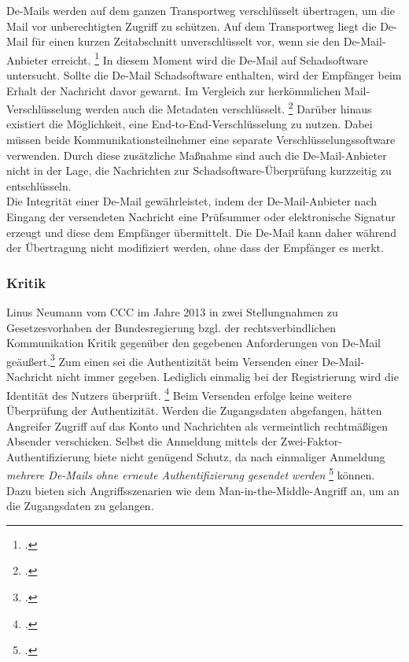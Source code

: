 \documentclass  [paper=a4,
				fontsize=12pt,
				listof=totoc,
				bibliography=totoc
				]{scrreprt}
\begin{document}
{			De-Mails werden auf dem ganzen Transportweg verschlüsselt übertragen, um die Mail vor unberechtigten Zugriff zu schützen.
			Auf dem Transportweg liegt die De-Mail für einen kurzen Zeitabschnitt unverschlüsselt vor, wenn sie den De-Mail-Anbieter erreicht. \footcite[Vgl.][S. 16]{BSIDeMail} 
			In diesem Moment wird die De-Mail auf Schadsoftware untersucht. Sollte die De-Mail Schadsoftware enthalten, wird der Empfänger beim Erhalt der Nachricht davor gewarnt.
			Im Vergleich zur herkömmlichen Mail-Verschlüsselung werden auch die Metadaten verschlüsselt. \footcite[Vgl.][]{BSIMerkmale}
			Darüber hinaus existiert die Möglichkeit, eine End-to-End-Verschlüsselung zu nutzen.
			Dabei müssen beide Kommunikationsteilnehmer eine separate Verschlüsselungssoftware verwenden. Durch diese zusätzliche Maßnahme sind auch die De-Mail-Anbieter nicht in der Lage, die Nachrichten zur Schadsoftware-Überprüfung kurzzeitig zu entschlüsseln.\medskip\\
			
			Die Integrität einer De-Mail gewährleistet, indem der De-Mail-Anbieter nach Eingang der versendeten Nachricht eine Prüfsummer oder elektronische Signatur erzeugt und diese dem Empfänger übermittelt.
			Die De-Mail kann daher während der Übertragung nicht modifiziert werden, ohne dass der Empfänger es merkt.
			
			\subsubsection{Kritik}
			Linus Neumann vom \ac{CCC} im Jahre 2013 in zwei Stellungnahmen zu Gesetzesvorhaben der Bundesregierung bzgl. der rechtsverbindlichen Kommunikation Kritik gegenüber den gegebenen Anforderungen von De-Mail geäußert.\footcite[Vgl.][]{Neumann2013a,Neumann2013b} %
			Zum einen sei die Authentizität beim Versenden einer De-Mail-Nachricht nicht immer gegeben. Lediglich einmalig bei der Registrierung wird die Identität des Nutzers überprüft. \footcite[Vgl.][]{Neumann2013b} 
			Beim Versenden erfolge keine weitere Überprüfung der Authentizität.
			Werden die Zugangsdaten abgefangen, hätten Angreifer Zugriff auf das Konto und Nachrichten als vermeintlich rechtmäßigen Absender verschicken.
			Selbst die Anmeldung mittels der Zwei-Faktor-Authentifizierung biete nicht genügend Schutz, da nach einmaliger Anmeldung \textit{\glqq mehrere De-Mails ohne erneute Authentifizierung gesendet werden\grqq} \footcite[Vgl.][o.S.]{Neumann2013b} können.
			Dazu bieten sich Angriffsszenarien wie dem Man-in-the-Middle-Angriff an, um an die Zugangsdaten zu gelangen.\medskip\\
			
}
\end{document}
